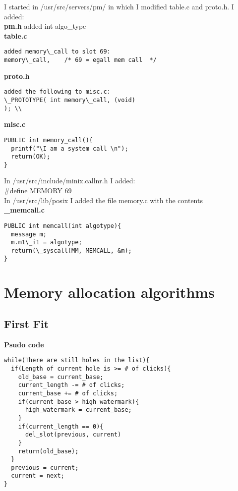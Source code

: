 \documentclass[a4paper, 12pt]{article}
\begin{document}
I started in /usr/src/servers/pm/ in which I modified table.c and proto.h. I added: \\
{\bf pm.h}
added int algo\_type\\
{\bf table.c}\\
\begin{verbatim}
added memory\_call to slot 69:
memory\_call,    /* 69 = egall mem call  */
\end{verbatim}


{\bf proto.h}\\
\begin{verbatim}
added the following to misc.c:
\_PROTOTYPE( int memory\_call, (void)                                     ); \\
\end{verbatim}

{\bf misc.c}
\begin{verbatim}
PUBLIC int memory_call(){
  printf("\I am a system call \n");
  return(OK);
}
\end{verbatim}


In /usr/src/include/minix.callnr.h I added: \\
\#define MEMORY            69 \\

In /usr/src/lib/posix I added the file memory.c with the contents\\

{\bf \_memcall.c}
\begin{verbatim}
PUBLIC int memcall(int algotype){
  message m;
  m.m1\_i1 = algotype;
  return(\_syscall(MM, MEMCALL, &m);
}
\end{verbatim}

\section{Memory allocation algorithms}

\subsection{First Fit}

{\bf Psudo code}

\begin{verbatim}
while(There are still holes in the list){
  if(Length of current hole is >= # of clicks){
    old_base = current_base;
    current_length -= # of clicks;
    current_base += # of clicks;
    if(current_base > high watermark){
      high_watermark = current_base;
    }
    if(current_length == 0){
      del_slot(previous, current)
    }
    return(old_base);
  }
  previous = current;
  current = next;
}
\end{verbatim}
\end{document}
